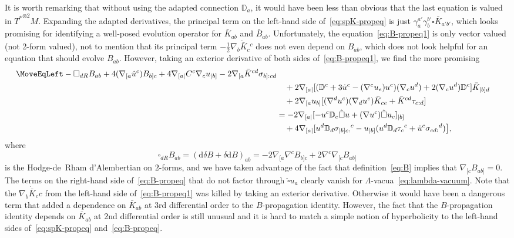 \documentclass[a4paper]{article}
\theoremstyle{remark}
\newcommand{\D}{\mathbb{D}}
\renewcommand{\d}{\mathrm{d}}
\begin{document}
It is worth remarking that without using the adapted connection $\D_a$,
it would have been less than obvious that the last equation is valued in
${T^*}^{\otimes 2} M$. Expanding the adapted derivatives, the principal
term on the left-hand side of~\eqref{eq:spK-propeq} is just
$\gamma_a^{a'} \gamma_b^{b'}\square \bar{K}_{a'b'}$, which looks
promising for identifying a well-posed evolution operator for
$\bar{K}_{ab}$ and $\bar{B}_{ab}$. Unfortunately, the
equation~\eqref{eq:B-propeq1} is only vector valued (not 2-form valued),
not to mention that its principal term $-\tfrac{1}{2} \nabla_b
\dot{\bar{K}}_c{}^c$ does not even depend on $B_{ab}$, which does not
look helpful for an equation that should evolve $B_{ab}$. However,
taking an exterior derivative of both sides of~\eqref{eq:B-propeq1}, we
find the more promising
\begin{align}
	\notag
	\MoveEqLeft
	-\square_{dR} B_{ab} + 4 (\nabla_{[a} \dot{u}^c) B_{b]c}
		+ 4 \nabla_{[a|} C^c \nabla_c u_{|b]} - 2\nabla_{[a} \bar{K}^{cd} \sigma_{b]:cd}
	\\ \notag & \quad {}
		+ 2 \nabla_{[a|} [(\D^c + 3 \dot{u}^c - (\nabla^e u_e) u^c) (\nabla_c u^d)
			+ 2 (\nabla_c u^d) \D^c] \bar{K}_{|b]d}
	\\ \notag & \quad {}
		+ 2 \nabla_{[a} u_{b]} [(\nabla^d u^c) (\nabla_d u^e) \bar{K}_{ce} + \bar{K}^{cd} \tau_{c:d}]
	\\
	\label{eq:B-propeq}
	&= - 2 \nabla_{[a|} [-u^c \D_c \hat{\square} u
			+ (\nabla u^c) \hat{\square} u_c]_{|b]}
	\\ \notag & \quad {}
		+ 4 \nabla_{[a|} [ u^d \D_d \sigma_{|b]c:}{}^c - u_{|b]} (u^d \D_d \tau_c{}^c + \dot{u}^c \sigma_{cd:}{}^d)  \big]
	,
\end{align}
where
\[
	\square_{dR} B_{ab}
	= (\d \delta B + \delta \d B)_{ab}
	= -2\nabla_{[a} \nabla^c B_{b]c} + 2\nabla^c \nabla_{[c} B_{ab]}
\]
is the Hodge-de~Rham d'Alembertian on $2$-forms, and we have taken
advantage of the fact that definition~\eqref{eq:B} implies that
$\nabla_{[c} B_{ab]} = 0$. The terms on the right-hand side
of~\eqref{eq:B-propeq} that do not factor through $\hat{\square} u_a$
clearly vanish for $\Lambda$-vacua~\eqref{eq:lambda-vacuum}.
Note that the $\nabla_b \dot{\bar{K}}_c^{}c$ from the left-hand side
of~\eqref{eq:B-propeq1} was killed by taking an
exterior derivative. Otherwise it would have been a dangerous term that
added a dependence on $\bar{K}_{ab}$ at 3rd differential order to the
$B$-propagation identity. However, the fact that the $B$-propagation
identity depends on $\bar{K}_{ab}$ at 2nd differential order is still
unusual and it is hard to match a simple notion of hyperbolicity to the
left-hand sides of~\eqref{eq:spK-propeq} and~\eqref{eq:B-propeq}.
\end{document}
